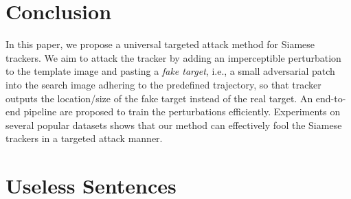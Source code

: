 \documentclass{article}
\begin{document}

\begin{table}[ht]
\centering
{}
\caption{Transferability of different tracking architectures on OTB2015.}
\label{tab:arch}
\end{table}

\section{Conclusion}

In this paper, we propose a universal targeted attack method for Siamese trackers. 
We aim to attack the tracker by adding an imperceptible perturbation to the template image and pasting a \textit{fake target}, i.e., a small adversarial patch into the search image adhering to the predefined trajectory, so that tracker outputs the location/size of the fake target instead of the real target. An end-to-end pipeline are proposed to train the perturbations efficiently.
Experiments on several popular datasets shows that our method can effectively fool the Siamese trackers in a targeted attack manner.

\clearpage



\section{Useless Sentences}
\end{document}
